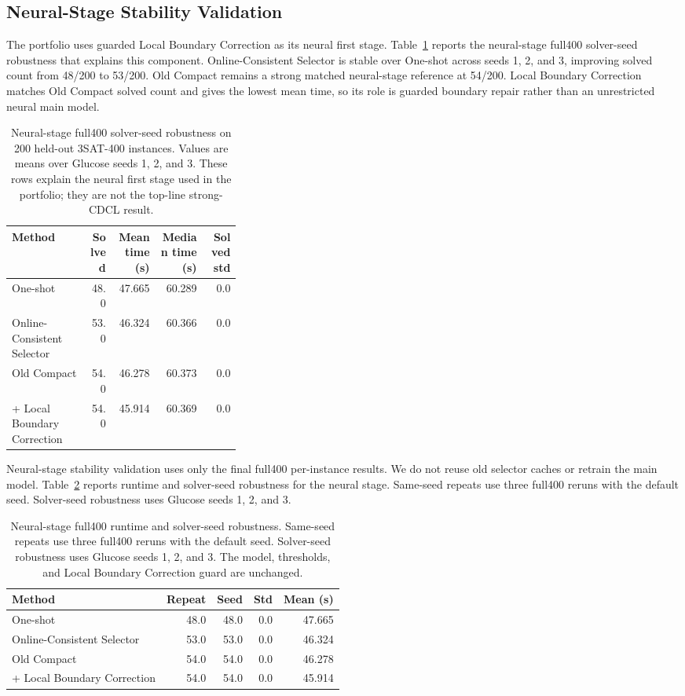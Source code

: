 \documentclass[11pt]{article}
\begin{document}
\subsection{Neural-Stage Stability Validation}

The portfolio uses guarded Local Boundary Correction as its neural first stage. Table~\ref{tab:neural-stage} reports the neural-stage full400 solver-seed robustness that explains this component. Online-Consistent Selector is stable over One-shot across seeds 1, 2, and 3, improving solved count from 48/200 to 53/200. Old Compact remains a strong matched neural-stage reference at 54/200. Local Boundary Correction matches Old Compact solved count and gives the lowest mean time, so its role is guarded boundary repair rather than an unrestricted neural main model.

\begin{table}[t]
\centering
\caption{Neural-stage full400 solver-seed robustness on 200 held-out 3SAT-400 instances. Values are means over Glucose seeds 1, 2, and 3. These rows explain the neural first stage used in the portfolio; they are not the top-line strong-CDCL result.}
\label{tab:neural-stage}
\begin{tabular}{p{0.34\linewidth}rrrr}
\toprule
Method & Solved & Mean time (s) & Median time (s) & Solved std \\
\midrule
One-shot & 48.0 & 47.665 & 60.289 & 0.0 \\
Online-Consistent Selector & 53.0 & 46.324 & 60.366 & 0.0 \\
Old Compact & 54.0 & 46.278 & 60.373 & 0.0 \\
+ Local Boundary Correction & 54.0 & 45.914 & 60.369 & 0.0 \\
\bottomrule
\end{tabular}
\end{table}

Neural-stage stability validation uses only the final full400 per-instance results. We do not reuse old selector caches or retrain the main model. Table~\ref{tab:full400-stability} reports runtime and solver-seed robustness for the neural stage. Same-seed repeats use three full400 reruns with the default seed. Solver-seed robustness uses Glucose seeds 1, 2, and 3.

\begin{table}[t]
\centering
\caption{Neural-stage full400 runtime and solver-seed robustness. Same-seed repeats use three full400 reruns with the default seed. Solver-seed robustness uses Glucose seeds 1, 2, and 3. The model, thresholds, and Local Boundary Correction guard are unchanged.}
\label{tab:full400-stability}
\begin{tabular}{lrrrr}
\toprule
Method & Repeat & Seed & Std & Mean (s) \\
\midrule
One-shot & 48.0 & 48.0 & 0.0 & 47.665 \\
Online-Consistent Selector & 53.0 & 53.0 & 0.0 & 46.324 \\
Old Compact & 54.0 & 54.0 & 0.0 & 46.278 \\
+ Local Boundary Correction & 54.0 & 54.0 & 0.0 & 45.914 \\
\bottomrule
\end{tabular}
\end{table}
\end{document}
